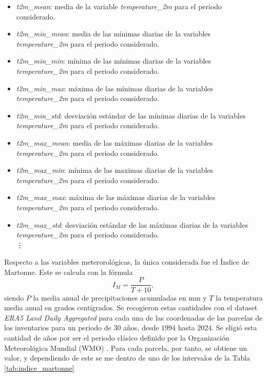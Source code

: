 \begin{itemize}
    \item \textit{t2m\_mean}: media de la variable \textit{temperature\_2m} para el periodo considerado.
    \item \textit{t2m\_min\_mean}: media de las mínimas diarias de la variables \textit{temperature\_2m} para el periodo considerado.
    \item \textit{t2m\_min\_min}: mínima de las mínimas diarias de la variables \textit{temperature\_2m} para el periodo considerado.
    \item \textit{t2m\_min\_max}: máxima de las mínimas diarias de la variables \textit{temperature\_2m} para el periodo considerado.
    \item \textit{t2m\_min\_std}: desviación estándar de las mínimas diarias de la variables \textit{temperature\_2m} para el periodo considerado.
    \item \textit{t2m\_max\_mean}: media de las máximas diarias de la variables \textit{temperature\_2m} para el periodo considerado.
    \item \textit{t2m\_max\_min}: mínima de las maximas diarias de la variables \textit{temperature\_2m} para el periodo considerado.
    \item \textit{t2m\_max\_max}: máxima de las máximas diarias de la variables \textit{temperature\_2m} para el periodo considerado.
    \item \textit{t2m\_max\_std}: desviación estándar de las máximas diarias de la variables \textit{temperature\_2m} para el periodo considerado.
    \\
    \vdots
\end{itemize}
Respecto a las variables meterorológicas, la única considerada fue el Índice de Martonne. Este se calcula con la fórmula
\begin{equation}
    I_M = \frac{P}{T + 10},
\end{equation}
siendo $P$ la media anual de precipitaciones acumuladas en mm y $T$ la temperatura media anual en grados centígrados. Se recogieron estas cantidades con el dataset \textit{ERA5 Land Daily Aggregated} para cada una de las coordenadas de las parcelas de los inventarios para un periodo de $30$ años, desde $1994$ hasta $2024$. Se eligió esta cantidad de años por ser el periodo clásico definido por la Organización Meteorológica Mundial (WMO) \cite{matthews2021annex}. 
Para cada parcela, por tanto, se obtiene un valor, y dependiendo de este se me dentro de uno de los intervalos de la Tabla \ref{tab:indice_martonne}


